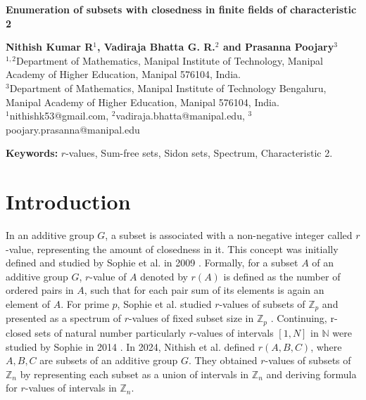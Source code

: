 \documentclass[12pt,a4paper]{article}
\begin{document}
	\begin{center}
		\textbf{Enumeration of subsets with closedness in finite fields of characteristic 2}
	\end{center}
	\begin{center}
		\textbf{Nithish Kumar R$^1$, Vadiraja Bhatta G. R.$^2$ and Prasanna Poojary$^3$}\\[3pt]
		$^{1,2}$Department of Mathematics, Manipal Institute of Technology, Manipal Academy of Higher
		Education, Manipal 576104, India.\\[3pt]
		$^3$Department of Mathematics, Manipal Institute of Technology Bengaluru, Manipal Academy of
		Higher Education, Manipal 576104, India.\\[3pt]
		$^1$nithishk53@gmail.com, $^2$vadiraja.bhatta@manipal.edu, $^3$poojary.prasanna@manipal.edu
	\end{center}
	\begin{abstract}
		The additive closedness in the subset of an additive group is termed as $r$-value. The nature of closedness in different subsets of fixed size is observed as a spectrum of $r$-values. We enumerate $r$-values of subsets in finite fields of characteristic 2 and represent them as the spectrum of values. Based on these values the subsets can be further studied as partial Steiner triple systems, sum-free sets, Sidon sets, and Schure triples.
	\end{abstract}
	\textbf{Keywords:} $r$-values, Sum-free sets, Sidon sets, Spectrum, Characteristic 2.
	\section{Introduction}	
	In an additive group $G$, a subset is associated with a non-negative integer called $r$-value, representing the amount of closedness in it. This concept was initially defined and studied by Sophie et al. in 2009 \cite{HUCZYNSKA2009831}. Formally, for a subset $A$ of an additive group $G$, $r$-value of $A$ denoted by $r(A)$ is defined as the number of ordered pairs in $A$, such that for each pair sum of its elements is again an element of $A$. For prime $p$, Sophie et al. studied $r$-values of subsets of $\mathbb{Z}_p$ and presented as a spectrum of $r$-values of fixed subset size in $\mathbb{Z}_p$ \cite{HUCZYNSKA2009831}. Continuing, r-closed sets of natural number particularly $r$-values of intervals $[1, N]$ in $\mathbb{N}$ were studied by Sophie in 2014 \cite{Huczynska2011}. In 2024, Nithish et al. defined $r(A,B,C)$, where $A,B,C$ are subsets of an additive group $G$. They obtained $r$-values of subsets of $\mathbb{Z}_n$ by representing each subset as a union of intervals in $\mathbb{Z}_n$ and deriving formula for $r$-values of intervals in $\mathbb{Z}_n$.
	
\end{document}
